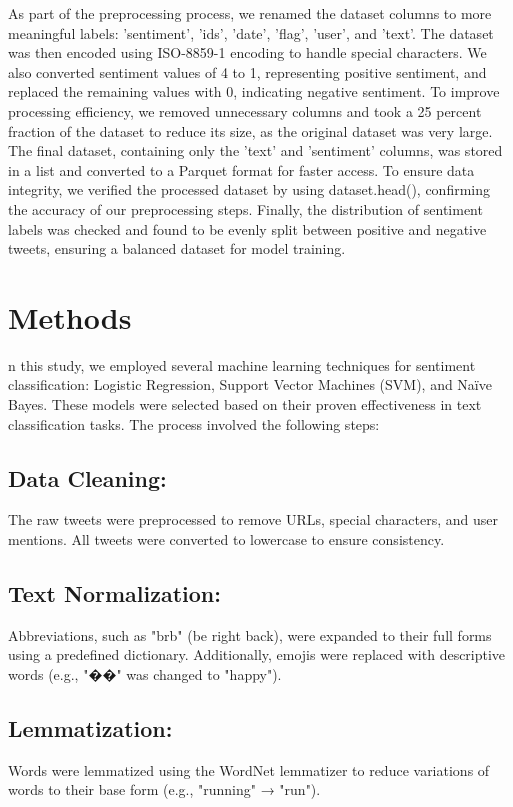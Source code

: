 \documentclass[conference]{IEEEtran}
\begin{document}
As part of the preprocessing process, we renamed the dataset columns to more meaningful labels: 'sentiment', 'ids', 'date', 'flag', 'user', and 'text'. 
The dataset was then encoded using ISO-8859-1 encoding to handle special characters. We also converted sentiment values of 4 to 1, representing positive sentiment, 
and replaced the remaining values with 0, indicating negative sentiment. To improve processing efficiency, we removed unnecessary columns and took a 25 percent
fraction of the dataset to reduce its size, as the original dataset was very large. The final dataset, containing only the 'text' and 'sentiment' columns, was 
stored in a list and converted to a Parquet format for faster access. To ensure data integrity, we verified the processed dataset by using dataset.head(), 
confirming the accuracy of our preprocessing steps. Finally, the distribution of sentiment labels was checked and found to be evenly split between positive 
and negative tweets, ensuring a balanced dataset for model training.

\section{Methods}
n this study, we employed several machine learning techniques for sentiment classification: Logistic Regression, Support Vector Machines (SVM),
 and Naïve Bayes. These models were selected based on their proven effectiveness in text classification tasks. The process involved the following steps:

   \subsection{Data Cleaning:} 
    The raw tweets were preprocessed to remove URLs, special characters, and user mentions. All tweets were converted to lowercase to ensure consistency.

    \subsection{Text Normalization:}
    Abbreviations, such as "brb" (be right back), were expanded to their full forms using a predefined dictionary. Additionally, emojis were replaced with descriptive words (e.g., "��" was changed to "happy").

    \subsection{Lemmatization:}
    Words were lemmatized using the WordNet lemmatizer to reduce variations of words to their base form (e.g., "running" → "run").
\end{document}
